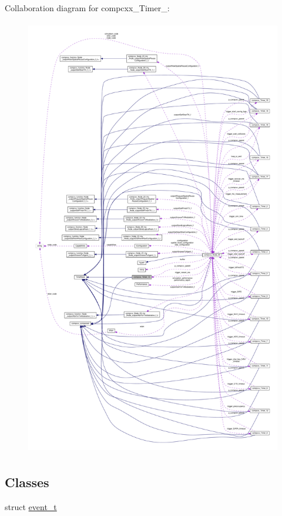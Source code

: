 Collaboration diagram for compcxx\+\_\+\+Timer\+\_\+:\nopagebreak
\begin{figure}[H]
\begin{center}
\leavevmode
\includegraphics[height=550pt]{classcompcxx__Timer__13__coll__graph}
\end{center}
\end{figure}
\subsection*{Classes}
\begin{DoxyCompactItemize}
\item 
struct \hyperlink{structcompcxx__Timer__13_1_1event__t}{event\+\_\+t}
\end{DoxyCompactItemize}

